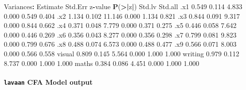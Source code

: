 \documentclass[]{article}
\newenvironment{Shaded}{\begin{snugshade}}{\end{snugshade}}
\newcommand{\ErrorTok}[1]{\textcolor[rgb]{0.64,0.00,0.00}{\textbf{#1}}}
\newcommand{\FloatTok}[1]{\textcolor[rgb]{0.00,0.00,0.81}{#1}}
\newcommand{\KeywordTok}[1]{\textcolor[rgb]{0.13,0.29,0.53}{\textbf{#1}}}
\newcommand{\NormalTok}[1]{#1}
\newcommand{\OperatorTok}[1]{\textcolor[rgb]{0.81,0.36,0.00}{\textbf{#1}}}
\newcommand{\StringTok}[1]{\textcolor[rgb]{0.31,0.60,0.02}{#1}}
\let\oldparagraph\paragraph
\renewcommand{\paragraph}[1]{\oldparagraph{#1}\mbox{}}
\begin{document}
\begin{Shaded}
\begin{Highlighting}[]
\NormalTok{Variances}\OperatorTok{:}
\StringTok{                   }\NormalTok{Estimate  Std.Err  z}\OperatorTok{-}\NormalTok{value  }\KeywordTok{P}\NormalTok{(}\OperatorTok{>}\ErrorTok{|}\NormalTok{z}\OperatorTok{|}\NormalTok{)   Std.lv  Std.all}
\NormalTok{   .x1                }\FloatTok{0.549}    \FloatTok{0.114}    \FloatTok{4.833}    \FloatTok{0.000}    \FloatTok{0.549}    \FloatTok{0.404}
\NormalTok{   .x2                }\FloatTok{1.134}    \FloatTok{0.102}   \FloatTok{11.146}    \FloatTok{0.000}    \FloatTok{1.134}    \FloatTok{0.821}
\NormalTok{   .x3                }\FloatTok{0.844}    \FloatTok{0.091}    \FloatTok{9.317}    \FloatTok{0.000}    \FloatTok{0.844}    \FloatTok{0.662}
\NormalTok{   .x4                }\FloatTok{0.371}    \FloatTok{0.048}    \FloatTok{7.779}    \FloatTok{0.000}    \FloatTok{0.371}    \FloatTok{0.275}
\NormalTok{   .x5                }\FloatTok{0.446}    \FloatTok{0.058}    \FloatTok{7.642}    \FloatTok{0.000}    \FloatTok{0.446}    \FloatTok{0.269}
\NormalTok{   .x6                }\FloatTok{0.356}    \FloatTok{0.043}    \FloatTok{8.277}    \FloatTok{0.000}    \FloatTok{0.356}    \FloatTok{0.298}
\NormalTok{   .x7                }\FloatTok{0.799}    \FloatTok{0.081}    \FloatTok{9.823}    \FloatTok{0.000}    \FloatTok{0.799}    \FloatTok{0.676}
\NormalTok{   .x8                }\FloatTok{0.488}    \FloatTok{0.074}    \FloatTok{6.573}    \FloatTok{0.000}    \FloatTok{0.488}    \FloatTok{0.477}
\NormalTok{   .x9                }\FloatTok{0.566}    \FloatTok{0.071}    \FloatTok{8.003}    \FloatTok{0.000}    \FloatTok{0.566}    \FloatTok{0.558}
\NormalTok{    visual            }\FloatTok{0.809}    \FloatTok{0.145}    \FloatTok{5.564}    \FloatTok{0.000}    \FloatTok{1.000}    \FloatTok{1.000}
\NormalTok{    writing           }\FloatTok{0.979}    \FloatTok{0.112}    \FloatTok{8.737}    \FloatTok{0.000}    \FloatTok{1.000}    \FloatTok{1.000}
\NormalTok{    maths             }\FloatTok{0.384}    \FloatTok{0.086}    \FloatTok{4.451}    \FloatTok{0.000}    \FloatTok{1.000}    \FloatTok{1.000}
\end{Highlighting}
\end{Shaded}

\hypertarget{lavaan-cfa-model-output}{%
\paragraph{\texorpdfstring{\texttt{lavaan} CFA Model output}{lavaan CFA Model output}}\label{lavaan-cfa-model-output}}
\end{document}
